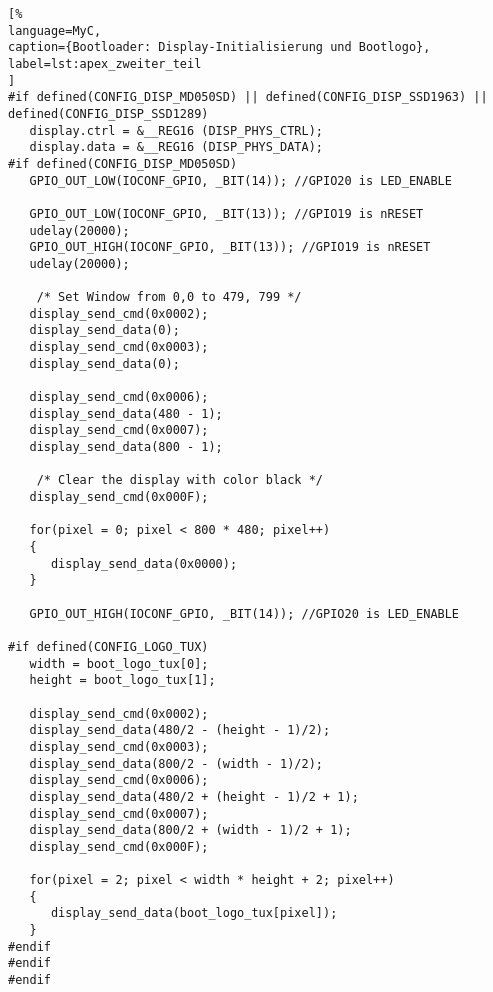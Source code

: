 \begin{lstlisting}[%
language=MyC,
caption={Bootloader: Display-Initialisierung und Bootlogo},
label=lst:apex_zweiter_teil
]
#if defined(CONFIG_DISP_MD050SD) || defined(CONFIG_DISP_SSD1963) || defined(CONFIG_DISP_SSD1289)
   display.ctrl = &__REG16 (DISP_PHYS_CTRL);   
   display.data = &__REG16 (DISP_PHYS_DATA); 
#if defined(CONFIG_DISP_MD050SD)
   GPIO_OUT_LOW(IOCONF_GPIO, _BIT(14)); //GPIO20 is LED_ENABLE

   GPIO_OUT_LOW(IOCONF_GPIO, _BIT(13)); //GPIO19 is nRESET
   udelay(20000);
   GPIO_OUT_HIGH(IOCONF_GPIO, _BIT(13)); //GPIO19 is nRESET
   udelay(20000);

	/* Set Window from 0,0 to 479, 799 */
   display_send_cmd(0x0002);			
   display_send_data(0);				
   display_send_cmd(0x0003);			
   display_send_data(0);				

   display_send_cmd(0x0006);
   display_send_data(480 - 1);
   display_send_cmd(0x0007);
   display_send_data(800 - 1);

	/* Clear the display with color black */
   display_send_cmd(0x000F);

   for(pixel = 0; pixel < 800 * 480; pixel++)
   {
      display_send_data(0x0000);
   }

   GPIO_OUT_HIGH(IOCONF_GPIO, _BIT(14)); //GPIO20 is LED_ENABLE

#if defined(CONFIG_LOGO_TUX)
   width = boot_logo_tux[0];
   height = boot_logo_tux[1];

   display_send_cmd(0x0002);
   display_send_data(480/2 - (height - 1)/2);
   display_send_cmd(0x0003);
   display_send_data(800/2 - (width - 1)/2);
   display_send_cmd(0x0006);
   display_send_data(480/2 + (height - 1)/2 + 1);
   display_send_cmd(0x0007);
   display_send_data(800/2 + (width - 1)/2 + 1);
   display_send_cmd(0x000F);

   for(pixel = 2; pixel < width * height + 2; pixel++)
   {
      display_send_data(boot_logo_tux[pixel]);
   }
#endif
#endif
#endif
\end{lstlisting}

